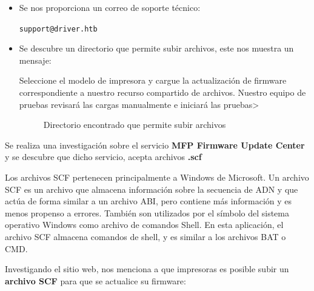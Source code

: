 \documentclass[a4paper]{article} %
\begin{document}
	\begin{itemize}
		\item Se nos proporciona un correo de soporte técnico:
		\begin{center}
        	        \texttt{support@driver.htb}
        	\end{center}

		\item Se descubre un directorio que permite subir archivos, este nos muestra un mensaje:
                \begin{tcolorbox}[colback=green!5!white,colframe=green!75!black] %
                        \centering
                        Seleccione el modelo de impresora y cargue la actualización de firmware correspondiente a nuestro recurso compartido de archivos. Nuestro equipo de pruebas revisará las cargas manualmente e iniciará las pruebas>
                \end{tcolorbox}

		\begin{figure}[h]
                	\centering
                	\setlength{\fboxrule}{0.8pt}
        	        \caption{Directorio encontrado que permite subir archivos}
	        \end{figure}
	\end{itemize}

        \vspace{0.3cm}

	\clearpage

	\justifying
	Se realiza una investigación sobre el servicio \textbf{MFP Firmware Update Center} y se descubre que dicho servicio, acepta archivos \textbf{.scf}

	\begin{definicion}
		Los archivos SCF pertenecen principalmente a Windows de Microsoft. Un archivo SCF es un archivo que almacena información sobre la secuencia de ADN y que actúa de forma similar a un archivo ABI, pero contiene más información y es menos propenso a errores. También son utilizados por el símbolo del sistema operativo Windows como archivo de comandos Shell. En esta aplicación, el archivo SCF almacena comandos de shell, y es similar a los archivos BAT o CMD.
	\end{definicion}

	Investigando el sitio web, nos menciona a que impresoras es posible subir un \textbf{archivo SCF} para que se actualice su firmware:
\end{document}
